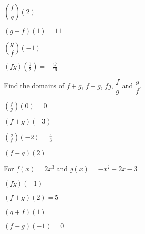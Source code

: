 \documentclass{ximera}
\begin{document}
\begin{question}
$\left(\dfrac{f}{g}\right)(2)$
\begin{solution}
$(g-f)(1) = 11$

\end{solution}

\end{question}

\begin{question}
$\left(\dfrac{g}{f}\right)(-1)$ 

\begin{solution}
$(fg)\left(\frac{1}{2}\right) = -\frac{47}{16}$
\end{solution}

\end{question}

\begin{question}
Find the domains of $f+g$, $f-g$,  $fg$, $\dfrac{f}{g}$ and $\dfrac{g}{f}$.  

\begin{solution}
$\left(\frac{f}{g}\right)(0) = 0$
\end{solution}

\end{question}

\begin{question}
$(f + g)(-3)$
\begin{solution}
$\left(\frac{g}{f}\right)\left(-2\right) = \frac{4}{3}$

\end{solution}

\end{question}

\begin{question}
$(f - g)(2)$
\begin{solution}
For $f(x) = 2x^3$ and  $g(x) = -x^2-2x-3$


\end{solution}

\end{question}

\begin{question}
$(fg)(-1)$

\begin{solution}
$(f+g)(2) = 5$
\end{solution}

\end{question}

\begin{question}
$(g + f)(1)$
\begin{solution}
$(f-g)(-1) = 0$
\end{solution}

\end{question}
\end{document}
